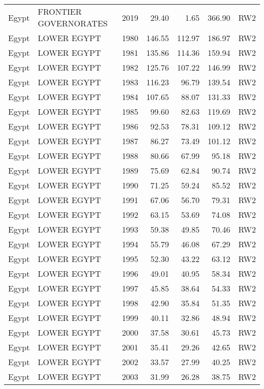 \begin{longtable}{lllrrrl}
  Egypt & FRONTIER GOVERNORATES & 2019 & 29.40 & 1.65 & 366.90 & RW2 \\ 
  Egypt & LOWER EGYPT & 1980 & 146.55 & 112.97 & 186.97 & RW2 \\ 
  Egypt & LOWER EGYPT & 1981 & 135.86 & 114.36 & 159.94 & RW2 \\ 
  Egypt & LOWER EGYPT & 1982 & 125.76 & 107.22 & 146.99 & RW2 \\ 
  Egypt & LOWER EGYPT & 1983 & 116.23 & 96.79 & 139.54 & RW2 \\ 
  Egypt & LOWER EGYPT & 1984 & 107.65 & 88.07 & 131.33 & RW2 \\ 
  Egypt & LOWER EGYPT & 1985 & 99.60 & 82.63 & 119.69 & RW2 \\ 
  Egypt & LOWER EGYPT & 1986 & 92.53 & 78.31 & 109.12 & RW2 \\ 
  Egypt & LOWER EGYPT & 1987 & 86.27 & 73.49 & 101.12 & RW2 \\ 
  Egypt & LOWER EGYPT & 1988 & 80.66 & 67.99 & 95.18 & RW2 \\ 
  Egypt & LOWER EGYPT & 1989 & 75.69 & 62.84 & 90.74 & RW2 \\ 
  Egypt & LOWER EGYPT & 1990 & 71.25 & 59.24 & 85.52 & RW2 \\ 
  Egypt & LOWER EGYPT & 1991 & 67.06 & 56.70 & 79.31 & RW2 \\ 
  Egypt & LOWER EGYPT & 1992 & 63.15 & 53.69 & 74.08 & RW2 \\ 
  Egypt & LOWER EGYPT & 1993 & 59.38 & 49.85 & 70.46 & RW2 \\ 
  Egypt & LOWER EGYPT & 1994 & 55.79 & 46.08 & 67.29 & RW2 \\ 
  Egypt & LOWER EGYPT & 1995 & 52.30 & 43.22 & 63.12 & RW2 \\ 
  Egypt & LOWER EGYPT & 1996 & 49.01 & 40.95 & 58.34 & RW2 \\ 
  Egypt & LOWER EGYPT & 1997 & 45.85 & 38.64 & 54.33 & RW2 \\ 
  Egypt & LOWER EGYPT & 1998 & 42.90 & 35.84 & 51.35 & RW2 \\ 
  Egypt & LOWER EGYPT & 1999 & 40.11 & 32.86 & 48.94 & RW2 \\ 
  Egypt & LOWER EGYPT & 2000 & 37.58 & 30.61 & 45.73 & RW2 \\ 
  Egypt & LOWER EGYPT & 2001 & 35.41 & 29.26 & 42.65 & RW2 \\ 
  Egypt & LOWER EGYPT & 2002 & 33.57 & 27.99 & 40.25 & RW2 \\ 
  Egypt & LOWER EGYPT & 2003 & 31.99 & 26.28 & 38.75 & RW2 \\ 

\end{longtable}
